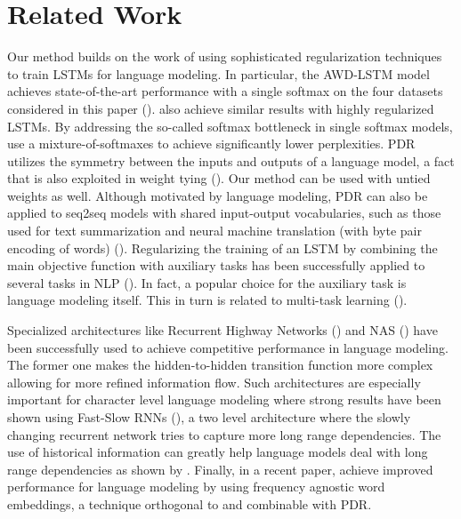 \documentclass{article} \usepackage{iclr2019_conference,times}
\begin{document}
\section{Related Work}
Our method builds on the work of using sophisticated regularization techniques to train LSTMs for language modeling. In particular, the AWD-LSTM model achieves state-of-the-art performance with a single softmax on the four datasets considered in this paper (\cite{Merity2018,Merity2018AnAO}). \cite{Melis2018} also achieve similar results with highly regularized LSTMs. By addressing the so-called softmax bottleneck in single softmax models, \cite{Yang2017BreakingTS} use a mixture-of-softmaxes to achieve significantly lower  perplexities. 
PDR utilizes the symmetry between the inputs and outputs of a language model, a fact that is also exploited in weight tying (\cite{Inan2016TyingWV,Press2017UsingTO}). Our method can be used with  untied weights as well. Although motivated by language modeling, PDR can also be applied to seq2seq models with shared input-output vocabularies, such as those used for text summarization and neural machine translation (with byte pair encoding of words) (\cite{Press2017UsingTO}). 
Regularizing the training of an LSTM by combining the main objective function with auxiliary tasks has been successfully applied to several tasks in NLP (\cite{Radford2018, Rei2017SemisupervisedML}). In fact, a popular choice for the auxiliary task is language modeling itself. This in turn is related to multi-task learning (\cite{Collobert2008AUA}). 

Specialized architectures like Recurrent Highway Networks (\cite{Zilly2017RecurrentHN}) and NAS (\cite{Zoph2016NeuralAS}) have been successfully used to achieve competitive performance in language modeling. The former one makes the hidden-to-hidden transition function more complex allowing for more refined information flow. Such architectures are especially important for character level language modeling where strong results have been shown using  Fast-Slow RNNs (\cite{Mujika2017FastSlowRN}), a two level architecture where the slowly changing recurrent network tries to capture more long range dependencies. The use of historical information can greatly help language models deal with long range dependencies as shown by \cite{Merity2016PointerSM,Krause2018DynamicEO,Rae2018FastPL}.  Finally, in a recent paper, \cite{Gong2018FRAGEFW} achieve improved performance for language modeling by using frequency agnostic word embeddings, a technique orthogonal to and combinable with PDR. 













\end{document}
